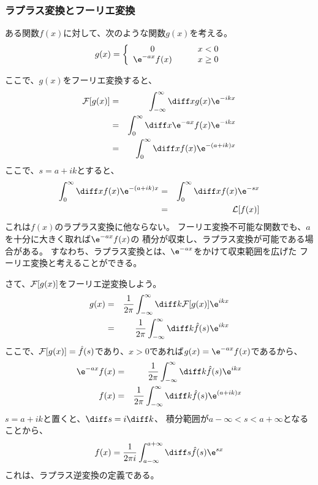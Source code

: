 \subsubsection{ラプラス変換とフーリエ変換}

ある関数$f(x)$に対して、次のような関数$g(x)$を考える。
\begin{equation}
  g(x) = \left\{
  \begin{array}{cc}
    0             & \qquad x<0      \\
    \e^{-ax} f(x) & \qquad x \geq 0
  \end{array}
  \right.
\end{equation}

ここで、$g(x)$をフーリエ変換すると、
\begin{eqnarray}
  {\cal F}[g(x)] &=& \int_{-\infty}^{\infty} \diff x g(x) \e^{-ikx}\\
  &=& \int_{0}^{\infty} \diff x \e^{-ax} f(x) \e^{-ikx}\\
  &=& \int_{0}^{\infty} \diff x f(x) \e^{-(a+ik)x}
\end{eqnarray}
ここで、$s = a+ik$とすると、
\begin{eqnarray}
  \int_{0}^{\infty} \diff x f(x) \e^{-(a+ik)x} &=& \int_{0}^{\infty} \diff x f(x) \e^{-sx}\\
  &=& {\cal L}[f(x)]
\end{eqnarray}
これは$f(x)$のラプラス変換に他ならない。
フーリエ変換不可能な関数でも、$a$を十分に大きく取れば$\e^{-ax} f(x)$の
積分が収束し、ラプラス変換が可能である場合がある。
すなわち、ラプラス変換とは、$\e^{-ax}$をかけて収束範囲を広げた
フーリエ変換と考えることができる。

さて、${\cal F}[g(x)]$をフーリエ逆変換しよう。
\begin{eqnarray}
  g(x) &=& \frac{1}{2\pi} \int_{-\infty}^{\infty} \diff k {\cal F}[g(x)] \e^{ikx}\\
  &=& \frac{1}{2\pi} \int_{-\infty}^{\infty} \diff k \hat{f}(s) \e^{ikx}
\end{eqnarray}
ここで、${\cal F}[g(x)] = \hat{f}(s)$であり、$x>0$であれば$g(x) = \e^{-ax} f(x)$であるから、
\begin{eqnarray}
  \e^{-ax} f(x) &=& \frac{1}{2\pi }  \int_{-\infty}^{\infty} \diff k \hat{f}(s) \e^{ikx}\\
  f(x) &=& \frac{1}{2\pi }  \int_{-\infty}^{\infty} \diff k \hat{f}(s) \e^{(a+ik)x}\\
\end{eqnarray}
$s = a + ik$と置くと、$\diff s = i \diff k$、
積分範囲が$a - \infty < s < a + \infty $となることから、
\begin{equation}
  f(x) = \frac{1}{2\pi i}  \int_{a-\infty}^{a+\infty} \diff s \hat{f}(s) \e^{sx}\\
\end{equation}
これは、ラプラス逆変換の定義である。

